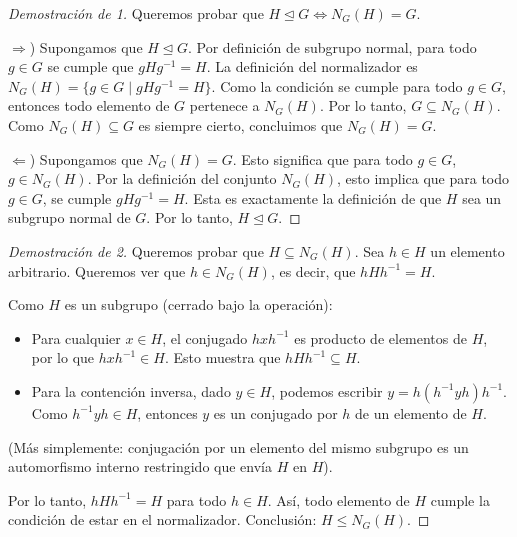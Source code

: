 \begin{proof}[Demostración de 1]
    Queremos probar que $H \trianglelefteq G \iff N_G(H) = G$.
    
    $\Rightarrow$) Supongamos que $H \trianglelefteq G$.
    Por definición de subgrupo normal, para todo $g \in G$ se cumple que $gHg^{-1} = H$.
    La definición del normalizador es $N_G(H) = \{g \in G \mid gHg^{-1} = H\}$.
    Como la condición se cumple para todo $g \in G$, entonces todo elemento de $G$ pertenece a $N_G(H)$.
    Por lo tanto, $G \subseteq N_G(H)$. Como $N_G(H) \subseteq G$ es siempre cierto, concluimos que $N_G(H) = G$.

    $\Leftarrow$) Supongamos que $N_G(H) = G$.
    Esto significa que para todo $g \in G$, $g \in N_G(H)$.
    Por la definición del conjunto $N_G(H)$, esto implica que para todo $g \in G$, se cumple $gHg^{-1} = H$.
    Esta es exactamente la definición de que $H$ sea un subgrupo normal de $G$.
    Por lo tanto, $H \trianglelefteq G$.
\end{proof}

\begin{proof}[Demostración de 2]
    Queremos probar que $H \subseteq N_G(H)$.
    Sea $h \in H$ un elemento arbitrario. Queremos ver que $h \in N_G(H)$, es decir, que $hHh^{-1} = H$.
    
    Como $H$ es un subgrupo (cerrado bajo la operación):
    \begin{itemize}
        \item Para cualquier $x \in H$, el conjugado $hxh^{-1}$ es producto de elementos de $H$, por lo que $hxh^{-1} \in H$. Esto muestra que $hHh^{-1} \subseteq H$.
        \item Para la contención inversa, dado $y \in H$, podemos escribir $y = h(h^{-1}yh)h^{-1}$. Como $h^{-1}yh \in H$, entonces $y$ es un conjugado por $h$ de un elemento de $H$.
    \end{itemize}
    (Más simplemente: conjugación por un elemento del mismo subgrupo es un automorfismo interno restringido que envía $H$ en $H$).
    
    Por lo tanto, $hHh^{-1} = H$ para todo $h \in H$.
    Así, todo elemento de $H$ cumple la condición de estar en el normalizador.
    Conclusión: $H \leq N_G(H)$.
\end{proof}

